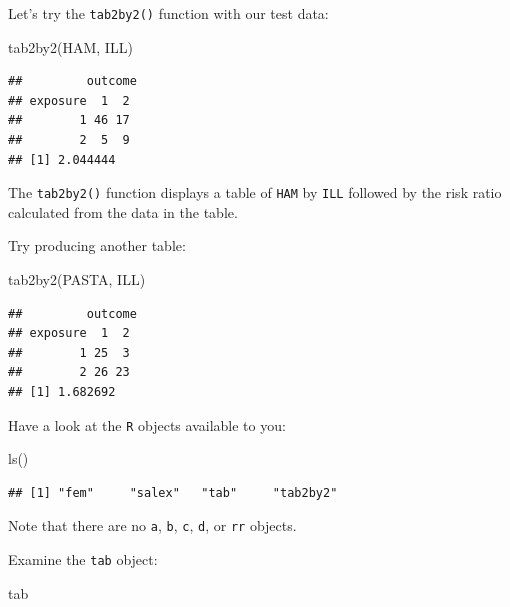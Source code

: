 \documentclass[
  12pt,
]{book}
\newenvironment{Shaded}{\begin{snugshade}}{\end{snugshade}}
\newcommand{\FunctionTok}[1]{\textcolor[rgb]{0.00,0.00,0.00}{#1}}
\newcommand{\NormalTok}[1]{#1}
\begin{document}
\newpage

Let's try the \texttt{tab2by2()} function with our test data:

\begin{Shaded}
\begin{Highlighting}[]
\FunctionTok{tab2by2}\NormalTok{(HAM, ILL)}
\end{Highlighting}
\end{Shaded}

\begin{verbatim}
##         outcome
## exposure  1  2
##        1 46 17
##        2  5  9
## [1] 2.044444
\end{verbatim}

The \texttt{tab2by2()} function displays a table of \texttt{HAM} by \texttt{ILL} followed by the risk ratio calculated from the data in the table.

Try producing another table:

\begin{Shaded}
\begin{Highlighting}[]
\FunctionTok{tab2by2}\NormalTok{(PASTA, ILL)}
\end{Highlighting}
\end{Shaded}

\begin{verbatim}
##         outcome
## exposure  1  2
##        1 25  3
##        2 26 23
## [1] 1.682692
\end{verbatim}

Have a look at the \texttt{R} objects available to you:

\begin{Shaded}
\begin{Highlighting}[]
\FunctionTok{ls}\NormalTok{()}
\end{Highlighting}
\end{Shaded}

\begin{verbatim}
## [1] "fem"     "salex"   "tab"     "tab2by2"
\end{verbatim}

Note that there are no \texttt{a}, \texttt{b}, \texttt{c}, \texttt{d}, or \texttt{rr} objects.

\newpage

Examine the \texttt{tab} object:

\begin{Shaded}
\begin{Highlighting}[]
\NormalTok{tab}
\end{Highlighting}
\end{Shaded}
\end{document}
